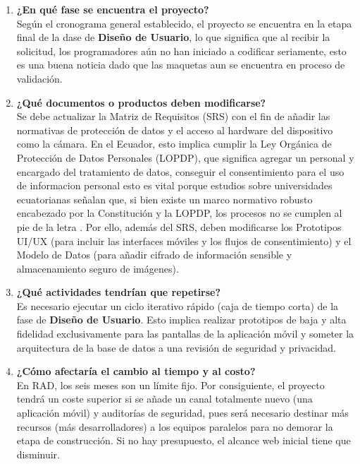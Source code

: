 \documentclass[pdflatex,sn-mathphys-num]{sn-jnl}%
\theoremstyle{thmstyleone}%
\theoremstyle{thmstyletwo}%
\theoremstyle{thmstylethree}%
\begin{document}
	 \begin{enumerate}
	 	\item \textbf{¿En qué fase se encuentra el proyecto?} \\
	 	Según el cronograma general establecido, el proyecto se encuentra en la etapa final de la dase de \textbf{Diseño de Usuario}, lo que significa que al recibir la solicitud, los programadores aún no han iniciado a codificar seriamente, esto es una buena noticia dado que las maquetas aun se encuentra en proceso de validación.
	 	
	 	\item \textbf{¿Qué documentos o productos deben modificarse?} \\
	 	Se debe actualizar la Matriz de Requisitos (SRS) con el fin de añadir las normativas de protección de datos y el acceso al hardware del dispositivo como la cámara. En el Ecuador, esto implica cumplir la Ley Orgánica de Protección de Datos Personales (LOPDP), que significa agregar un personal y encargado del tratamiento de datos, conseguir el consentimiento para el uso de informacion personal esto es vital porque estudios sobre universidades ecuatorianas señalan que, si bien existe un marco normativo robusto encabezado por la Constitución y la LOPDP, los procesos no se cumplen al pie de la letra \cite{piray-rodriguez_alisis_2025}. Por ello, además del SRS, deben modificarse los Prototipos UI/UX (para incluir las interfaces móviles y los flujos de consentimiento) y el Modelo de Datos (para añadir cifrado de información sensible y almacenamiento seguro de imágenes).
	 	
	 	\item \textbf{¿Qué actividades tendrían que repetirse?} \\
	 	Es necesario ejecutar un ciclo iterativo rápido (caja de tiempo corta) de la fase de \textbf{Diseño de Usuario}. Esto implica realizar prototipos de baja y alta fidelidad exclusivamente para las pantallas de la aplicación móvil y someter la arquitectura de la base de datos a una revisión de seguridad y privacidad.
	 	
	 	\item \textbf{¿Cómo afectaría el cambio al tiempo y al costo?} \\
	 	En RAD, los seis meses son un límite fijo. Por consiguiente, el proyecto tendrá un coste superior si se añade un canal totalmente nuevo (una aplicación móvil) y auditorías de seguridad, pues será necesario destinar más recursos (más desarrolladores) a los equipos paralelos para no demorar la etapa de construcción. Si no hay presupuesto, el alcance web inicial tiene que disminuir.
	 	

\end{enumerate}
\end{document}
